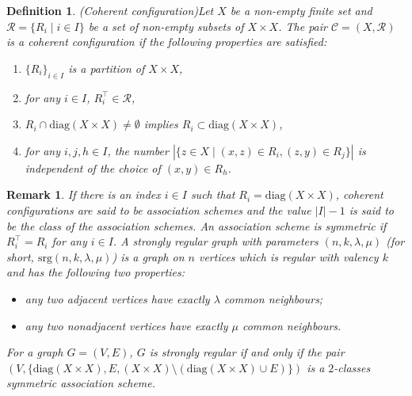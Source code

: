 \documentclass[11pt]{article}
\newtheorem{definition}{Definition}[section]
\newtheorem{remark}{Remark}[section]
\theoremstyle{definition}
\theoremstyle{remark}
\begin{document}
\begin{definition}{\rm (Coherent configuration)}\label{cc}
Let $X$ be a non-empty finite set and $\mathcal{R}=\{R_i \mid i\in I\}$ be a set of non-empty subsets of $X\times X$.
The pair $\mathcal{C}=(X,\mathcal{R})$ is a coherent configuration if the following properties are satisfied:
\begin{enumerate}
\item[\rm (i)] $\{R_i\}_{i\in I}$ is a partition of $X\times X$,
\item[\rm (ii)] for any $i \in I$, $R_i^\top\in \mathcal{R}$, 
\item[\rm (iii)] $R_i \cap \mathrm{diag}(X\times X)\neq \emptyset$ implies $R_i \subset\mathrm{diag}(X\times X)$,
\item[\rm (iv)] for any $i,j,h\in I$, the number $|\{z\in X \mid (x,z)\in R_i,(z,y)\in R_j\}|$ is independent of the choice of $(x,y)\in R_h$.   
\end{enumerate}
\end{definition}

\begin{remark}
If there is an index $i\in I$ such that $R_i=\mathrm{diag}(X \times X)$, coherent configurations are said to be association schemes and the value $|I|-1$ is said to be the class of the association schemes.  
An association scheme is symmetric if $R_i^\top=R_i$ for any $i\in I$. 
A {\it strongly regular graph} with parameters $(n, k, \lambda, \mu)$ (for short, $\mathrm{srg}(n, k, \lambda, \mu)$) is a graph on $n$ vertices which is regular with valency $k$ and 
has the following two properties:
\begin{itemize}
\item[\rm (i)] any two adjacent vertices have exactly $\lambda$ common neighbours;
\item[\rm (ii)]  any two nonadjacent vertices have exactly $\mu$ common neighbours.
\end{itemize}
For a graph $G=(V,E)$,  $G$ is strongly regular if and only if the pair $(V,\{\mathrm{diag}(X \times X),E, (X\times X)\setminus (\mathrm{diag}(X \times X)\cup E)\})$ is a $2$-classes symmetric association scheme.   
	
\end{remark}
\end{document}
